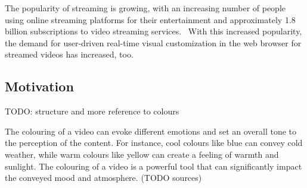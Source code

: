 \documentclass[12pt,a4paper]{article}
\begin{document}
The popularity of streaming is growing, with an increasing number of people using online streaming platforms for their entertainment and approximately 1.8 billion subscriptions to video streaming services.~\cite{nielsen, stats}
%
With this increased popularity, the demand for user-driven real-time visual customization in the web browser for streamed videos has increased, too.


















\subsection{Motivation} \label{subsection:motivation}
TODO: structure and more reference to colours


The colouring of a video can evoke different emotions and set an overall tone to the perception of the content. For instance, cool colours like blue can convey cold weather, while warm colours like yellow can create a feeling of warmth and sunlight. 
The colouring of a video is a powerful tool that can significantly impact the conveyed mood and atmosphere. (TODO sources)
\end{document}
